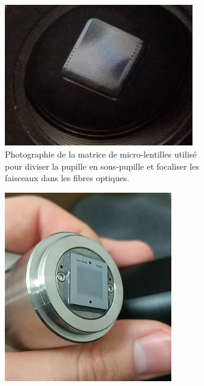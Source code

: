 \begin{figure}[ht!]
    \centering
    \begin{subfigure}{0.5\textwidth}
        \centering
        \includegraphics[width=0.9\textwidth]{Figure_Chap2/MicroLensArray.jpg}
        \caption{Photographie de la matrice de micro-lentilles utilisé pour diviser la pupille en sous-pupille et focaliser les faisceaux dans les fibres optiques.}
        \label{fig:InjectionCompA}
    \end{subfigure}
    \begin{subfigure}[t]{0.5\textwidth}
        \centering
        \includegraphics[width=0.8\textwidth]{Figure_Chap2/FiberBundle_Meudon03.jpg}

\end{subfigure}
\end{figure}
